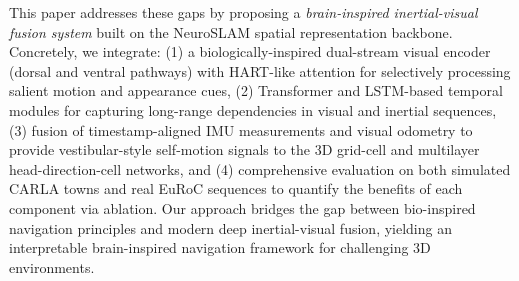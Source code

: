 This paper addresses these gaps by proposing a \emph{brain-inspired inertial-visual fusion system} built on the NeuroSLAM spatial representation backbone. Concretely, we integrate:
(1) a biologically-inspired dual-stream visual encoder (dorsal and ventral pathways) with HART-like attention for selectively processing salient motion and appearance cues,
(2) Transformer and LSTM-based temporal modules for capturing long-range dependencies in visual and inertial sequences,
(3) fusion of timestamp-aligned IMU measurements and visual odometry to provide vestibular-style self-motion signals to the 3D grid-cell and multilayer head-direction-cell networks, and
(4) comprehensive evaluation on both simulated CARLA towns and real EuRoC sequences to quantify the benefits of each component via ablation.
Our approach bridges the gap between bio-inspired navigation principles and modern deep inertial-visual fusion, yielding an interpretable brain-inspired navigation framework for challenging 3D environments.
